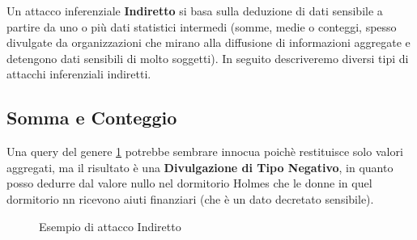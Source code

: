 Un attacco inferenziale \textbf{Indiretto} si basa sulla deduzione di dati sensibile a partire da uno o più dati statistici intermedi (somme, medie o conteggi, spesso divulgate da organizzazioni che mirano alla diffusione di informazioni aggregate e detengono dati sensibili di molto soggetti). In seguito descriveremo diversi tipi di attacchi inferenziali indiretti.

\subsection{Somma e Conteggio}

Una query del genere \ref{fig:query_indiretta_result} potrebbe sembrare innocua poichè restituisce solo valori aggregati, ma il risultato è una \textbf{Divulgazione di Tipo Negativo}, in quanto posso dedurre dal valore nullo nel dormitorio Holmes che le donne in quel dormitorio nn ricevono aiuti finanziari (che è un dato decretato sensibile). 

\begin{figure}[htbp]
	\centering
	
				
							\caption{Esempio di attacco Indiretto \label{fig:query_indiretta_result}}                           
	
\end{figure}

